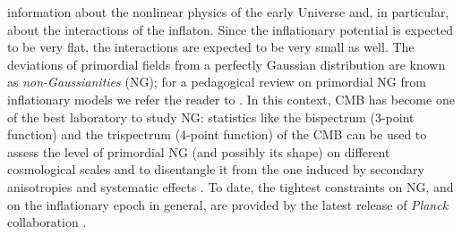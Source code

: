 information about the nonlinear physics of the early Universe and, in particular, about the interactions of
the inflaton. Since the inflationary potential is expected to be very flat, the interactions are expected to be 
very small as well. The deviations of primordial fields from a perfectly Gaussian distribution are known as
\emph{non-Gaussianities} (NG); for a pedagogical review on primordial NG from inflationary models we
refer the reader to \cite{Chen2010}. In this context, \gls{CMB} has become one of the best laboratory to study
NG: statistics like the bispectrum (3-point function) and the trispectrum (4-point function) of the \gls{CMB} can
be used to assess the level of primordial NG (and possibly its shape) on different cosmological scales 
and to disentangle it from the one induced by secondary anisotropies and systematic effects 
\citep{Bartolo2010}. To date, the tightest constraints on NG, and on the inflationary epoch in general, are provided by the latest release of \textit{Planck} collaboration \citep{Ade:2015ava}.

